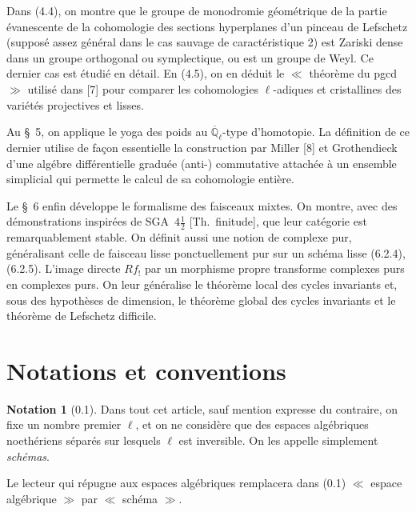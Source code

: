 \documentclass[12pt,a4paper]{article}
\theoremstyle{plain}
\theoremstyle{definition}
\newtheorem{notation}[theorem]{Notation}
\theoremstyle{definition}
\theoremstyle{remark}
\begin{document}
Dans (4.4), on montre que le groupe de monodromie g\'eom\'etrique de la partie \'evanescente de la cohomologie des sections hyperplanes d'un pinceau de Lefschetz (suppos\'e assez g\'en\'eral dans le cas sauvage de caract\'eristique 2) est Zariski dense dans un groupe orthogonal ou symplectique, ou est un groupe de Weyl. Ce dernier cas est \'etudi\'e en d\'etail. En (4.5), on en d\'eduit le $\ll$ th\'eor\`eme du pgcd $\gg$ utilis\'e dans [7] pour comparer les cohomologies $\ell$-adiques et cristallines des vari\'et\'es projectives et lisses.

Au \S~5, on applique le yoga des poids au $\overline{\mathbb{Q}}_\ell$-type d'homotopie. La d\'efinition de ce dernier utilise de fa\c con essentielle la construction par Miller [8] et Grothendieck d'une alg\'ebre diff\'erentielle gradu\'ee (anti-) commutative attach\'ee \`a un ensemble simplicial qui permette le calcul de sa cohomologie enti\`ere.

Le \S~6 enfin d\'eveloppe le formalisme des faisceaux mixtes. On montre, avec des d\'emonstrations inspir\'ees de SGA~$4\frac{1}{2}$ [Th.~finitude], que leur cat\'egorie est remarquablement stable. On d\'efinit aussi une notion de complexe pur, g\'en\'eralisant celle de faisceau lisse ponctuellement pur sur un sch\'ema lisse (6.2.4), (6.2.5). L'image directe $Rf_!$ par un morphisme propre transforme complexes purs en complexes purs. On leur g\'en\'eralise le th\'eor\`eme local des cycles invariants et, sous des hypoth\`eses de dimension, le th\'eor\`eme global des cycles invariants et le th\'eor\`eme de Lefschetz difficile.

\newpage

\section*{Notations et conventions}

\begin{notation}[0.1]
Dans tout cet article, sauf mention expresse du contraire, on fixe un nombre premier $\ell$, et on ne consid\`ere que des espaces alg\'ebriques noeth\'eriens s\'epar\'es sur lesquels $\ell$ est inversible. On les appelle simplement \emph{sch\'emas}.

Le lecteur qui r\'epugne aux espaces alg\'ebriques remplacera dans (0.1) $\ll$ espace alg\'ebrique $\gg$ par $\ll$ sch\'ema $\gg$.
\end{notation}
\end{document}
